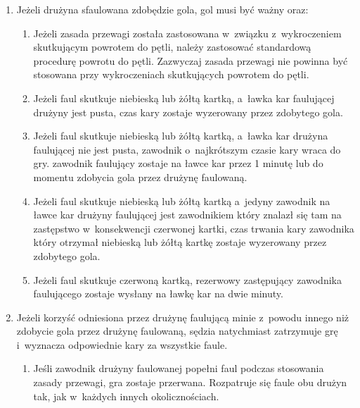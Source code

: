 \documentclass[12pt,a4paper]{article}
\begin{document}
\begin{enumerate}
	\item
	      Jeżeli drużyna sfaulowana zdobędzie gola, gol musi być ważny oraz:

	      \begin{enumerate}
		      \item
		            Jeżeli zasada przewagi została zastosowana w~związku z~wykroczeniem
		            skutkującym powrotem do pętli, należy zastosować standardową
		            procedurę powrotu do pętli. Zazwyczaj zasada przewagi nie powinna
		            być stosowana przy wykroczeniach skutkujących powrotem do pętli.
		      \item
		            Jeżeli faul skutkuje niebieską lub żółtą kartką, a~ławka kar
		            faulującej drużyny jest pusta, czas kary zostaje wyzerowany przez
		            zdobytego gola.
		      \item
		            Jeżeli faul skutkuje niebieską lub żółtą kartką, a~ławka kar drużyna
		            faulującej nie jest pusta, zawodnik o~najkrótszym czasie kary wraca
		            do gry. zawodnik faulujący zostaje na ławce kar przez 1 minutę lub
		            do momentu zdobycia gola przez drużynę faulowaną.
		      \item
		            Jeżeli faul skutkuje niebieską lub żółtą kartką a~jedyny zawodnik na
		            ławce kar drużyny faulującej jest zawodnikiem który znalazł się tam
		            na zastępstwo w~konsekwencji czerwonej kartki, czas trwania kary
		            zawodnika który otrzymał niebieską lub żółtą kartkę zostaje
		            wyzerowany przez zdobytego gola.
		      \item
		            Jeżeli faul skutkuje czerwoną kartką, rezerwowy zastępujący
		            zawodnika faulującego zostaje wysłany na ławkę kar na dwie minuty.
	      \end{enumerate}
	\item
	      Jeżeli korzyść odniesiona przez drużynę faulującą minie z~powodu innego niż zdobycie gola przez drużynę faulowaną, sędzia
	      natychmiast zatrzymuje grę i~wyznacza odpowiednie kary za wszystkie
	      faule.

	      \begin{enumerate}
		      \item
		            Jeśli zawodnik drużyny faulowanej popełni faul podczas stosowania
		            zasady przewagi, gra zostaje przerwana. Rozpatruje się faule obu
		            drużyn tak, jak w~każdych innych okolicznościach.


\end{enumerate}
\end{enumerate}
\end{document}
